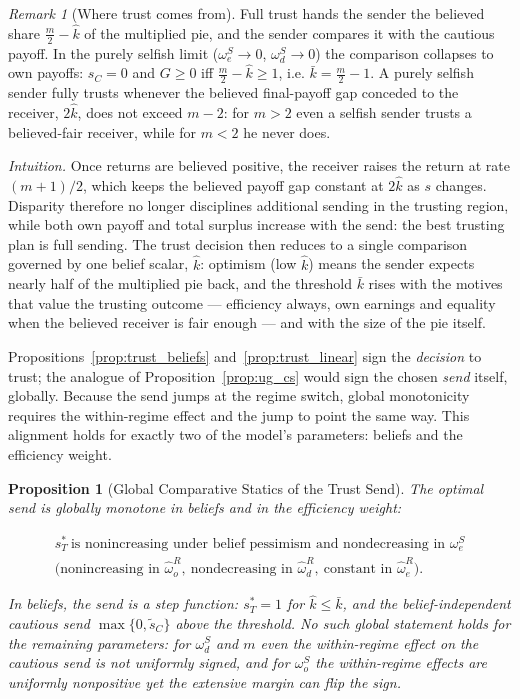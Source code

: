 \documentclass[11pt]{article}
\theoremstyle{plain}
\newtheorem{proposition}{Proposition}
\theoremstyle{remark}
\newtheorem{remark}{Remark}
\begin{document}
\begin{remark}[Where trust comes from]
Full trust hands the sender the believed share $\tfrac m2-\hat k$ of the multiplied pie, and the sender compares it with the cautious payoff.  In the purely selfish limit ($\omega_e^S\to0$, $\omega_d^S\to0$) the comparison collapses to own payoffs: $s_C=0$ and $G\ge0$ iff $\tfrac m2-\hat k\ge1$, i.e. $\bar k=\tfrac m2-1$.  A purely selfish sender fully trusts whenever the believed final-payoff gap conceded to the receiver, $2\hat k$, does not exceed $m-2$: for $m>2$ even a selfish sender trusts a believed-fair receiver, while for $m<2$ he never does.
\end{remark}

\noindent\emph{Intuition.}  Once returns are believed positive, the receiver raises the return at rate $(m+1)/2$, which keeps the believed payoff gap constant at $2\hat k$ as $s$ changes.  Disparity therefore no longer disciplines additional sending in the trusting region, while both own payoff and total surplus increase with the send: the best trusting plan is full sending.  The trust decision then reduces to a single comparison governed by one belief scalar, $\hat k$: optimism (low $\hat k$) means the sender expects nearly half of the multiplied pie back, and the threshold $\bar k$ rises with the motives that value the trusting outcome --- efficiency always, own earnings and equality when the believed receiver is fair enough --- and with the size of the pie itself.

Propositions~\ref{prop:trust_beliefs} and~\ref{prop:trust_linear} sign the \emph{decision} to trust; the analogue of Proposition~\ref{prop:ug_cs} would sign the chosen \emph{send} itself, globally.  Because the send jumps at the regime switch, global monotonicity requires the within-regime effect and the jump to point the same way.  This alignment holds for exactly two of the model's parameters: beliefs and the efficiency weight.

\begin{proposition}[Global Comparative Statics of the Trust Send]
\label{prop:trust_global}
The optimal send is globally monotone in beliefs and in the efficiency weight:
\begin{csbox}
\begin{gather*}
        s_T^\ast\ \text{is nonincreasing under belief pessimism and nondecreasing in }\omega_e^S\\
        \big(\text{nonincreasing in }\hat\omega_o^{R},\ \text{nondecreasing in }\hat\omega_d^{R},\ \text{constant in }\hat\omega_e^{R}\big).
\end{gather*}
\end{csbox}
In beliefs, the send is a step function: $s_T^\ast=1$ for $\hat k\le\bar k$, and the belief-independent cautious send $\max\{0,\tilde s_C\}$ above the threshold.  No such global statement holds for the remaining parameters: for $\omega_d^S$ and $m$ even the within-regime effect on the cautious send is not uniformly signed, and for $\omega_o^S$ the within-regime effects are uniformly nonpositive yet the extensive margin can flip the sign.
\end{proposition}
\end{document}
